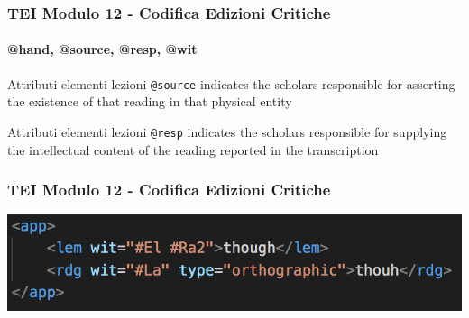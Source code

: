 \begin{frame}
    \frametitle{TEI Modulo 12 - Codifica Edizioni Critiche}
    \framesubtitle{@hand, @source, @resp, @wit}
    \addtocounter{nframe}{1}





    \begin{block}{Attributi elementi lezioni}
        \texttt{@source} indicates the scholars responsible for asserting the existence of that reading in that physical entity
    \end{block}

    \begin{block}{Attributi elementi lezioni}
         \texttt{@resp} indicates the scholars responsible for supplying the intellectual content of the reading reported in the transcription
    \end{block}

\end{frame}


\begin{frame}
    \frametitle{TEI Modulo 12 - Codifica Edizioni Critiche}
    \addtocounter{nframe}{1}
        
    \begin{center}
        \includegraphics[width=.95\textwidth]{imgs/1-rdg-type.png}
    \end{center}

\end{frame}

